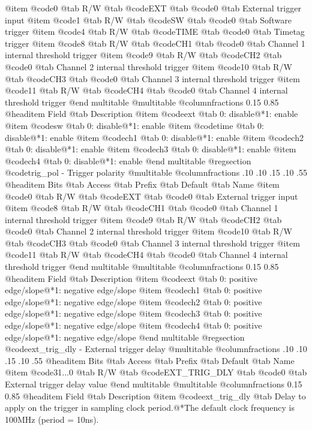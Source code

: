 @item @code{0}
@tab R/W @tab
@code{EXT}
@tab @code{0} @tab 
External trigger input
@item @code{1}
@tab R/W @tab
@code{SW}
@tab @code{0} @tab 
Software trigger
@item @code{4}
@tab R/W @tab
@code{TIME}
@tab @code{0} @tab 
Timetag trigger
@item @code{8}
@tab R/W @tab
@code{CH1}
@tab @code{0} @tab 
Channel 1 internal threshold trigger
@item @code{9}
@tab R/W @tab
@code{CH2}
@tab @code{0} @tab 
Channel 2 internal threshold trigger
@item @code{10}
@tab R/W @tab
@code{CH3}
@tab @code{0} @tab 
Channel 3 internal threshold trigger
@item @code{11}
@tab R/W @tab
@code{CH4}
@tab @code{0} @tab 
Channel 4 internal threshold trigger
@end multitable
@multitable @columnfractions 0.15 0.85
@headitem Field @tab Description
@item @code{ext} @tab 0: disable@*1: enable
@item @code{sw} @tab 0: disable@*1: enable
@item @code{time} @tab 0: disable@*1: enable
@item @code{ch1} @tab 0: disable@*1: enable
@item @code{ch2} @tab 0: disable@*1: enable
@item @code{ch3} @tab 0: disable@*1: enable
@item @code{ch4} @tab 0: disable@*1: enable
@end multitable
@regsection @code{trig_pol} - Trigger polarity
@multitable @columnfractions .10 .10 .15 .10 .55
@headitem Bits @tab Access @tab Prefix @tab Default @tab Name
@item @code{0}
@tab R/W @tab
@code{EXT}
@tab @code{0} @tab 
External trigger input
@item @code{8}
@tab R/W @tab
@code{CH1}
@tab @code{0} @tab 
Channel 1 internal threshold trigger
@item @code{9}
@tab R/W @tab
@code{CH2}
@tab @code{0} @tab 
Channel 2 internal threshold trigger
@item @code{10}
@tab R/W @tab
@code{CH3}
@tab @code{0} @tab 
Channel 3 internal threshold trigger
@item @code{11}
@tab R/W @tab
@code{CH4}
@tab @code{0} @tab 
Channel 4 internal threshold trigger
@end multitable
@multitable @columnfractions 0.15 0.85
@headitem Field @tab Description
@item @code{ext} @tab 0: positive edge/slope@*1: negative edge/slope
@item @code{ch1} @tab 0: positive edge/slope@*1: negative edge/slope
@item @code{ch2} @tab 0: positive edge/slope@*1: negative edge/slope
@item @code{ch3} @tab 0: positive edge/slope@*1: negative edge/slope
@item @code{ch4} @tab 0: positive edge/slope@*1: negative edge/slope
@end multitable
@regsection @code{ext_trig_dly} - External trigger delay
@multitable @columnfractions .10 .10 .15 .10 .55
@headitem Bits @tab Access @tab Prefix @tab Default @tab Name
@item @code{31...0}
@tab R/W @tab
@code{EXT_TRIG_DLY}
@tab @code{0} @tab 
External trigger delay value
@end multitable
@multitable @columnfractions 0.15 0.85
@headitem Field @tab Description
@item @code{ext_trig_dly} @tab Delay to apply on the trigger in sampling clock period.@*The default clock frequency is 100MHz (period = 10ns).
